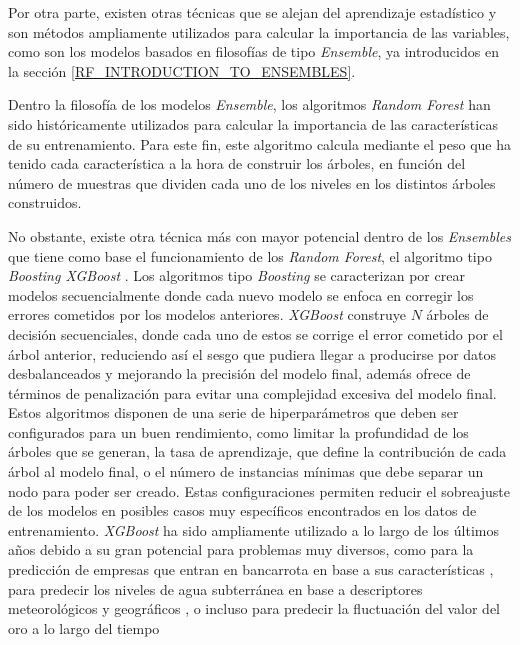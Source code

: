 \documentclass{uathesis-es}
\begin{document}
	
	Por otra parte, existen otras técnicas que se alejan del aprendizaje estadístico y son métodos ampliamente utilizados para calcular la importancia de las variables, como son los modelos basados en filosofías de tipo \textit{Ensemble}, ya introducidos en la sección \ref{RF_INTRODUCTION_TO_ENSEMBLES}.
	
	Dentro la filosofía de los modelos \textit{Ensemble}, los algoritmos \textit{Random Forest} han sido históricamente utilizados para calcular la importancia de las características de su entrenamiento. Para este fin, este algoritmo calcula mediante el peso que ha tenido cada característica a la hora de construir los árboles, en función del número de muestras que dividen cada uno de los niveles en los distintos árboles construidos.
	
	No obstante, existe otra técnica más con mayor potencial dentro de los \textit{Ensembles} que tiene como base el funcionamiento de los \textit{Random Forest}, el algoritmo tipo \textit{Boosting XGBoost} \cite{Chen_2016}. Los algoritmos tipo \textit{Boosting} se caracterizan por crear modelos secuencialmente donde cada nuevo modelo se enfoca en corregir los errores cometidos por los modelos anteriores. \textit{XGBoost} construye $N$ árboles de decisión secuenciales, donde cada uno de estos se corrige el error cometido por el árbol anterior, reduciendo así el sesgo que pudiera llegar a producirse por datos desbalanceados y mejorando la precisión del modelo final, además ofrece de términos de penalización para evitar una complejidad excesiva del modelo final. Estos algoritmos disponen de una serie de hiperparámetros que deben ser configurados para un buen rendimiento, como limitar la profundidad de los árboles que se generan, la tasa de aprendizaje, que define la contribución de cada árbol al modelo final, o el número de instancias mínimas que debe separar un nodo para poder ser creado. Estas configuraciones permiten reducir el sobreajuste de los modelos en posibles casos muy específicos encontrados en los datos de entrenamiento. \textit{XGBoost} ha sido ampliamente utilizado a lo largo de los últimos años debido a su gran potencial para problemas muy diversos, como para la predicción de empresas que entran en bancarrota en base a sus características \cite{BenJabeur2023}, para predecir los niveles de agua subterránea en base a descriptores meteorológicos y geográficos \cite{IBRAHEMAHMEDOSMAN20211545}, o incluso para predecir la fluctuación del valor del oro a lo largo del tiempo \cite{Jabeur2021}
	
\end{document}
